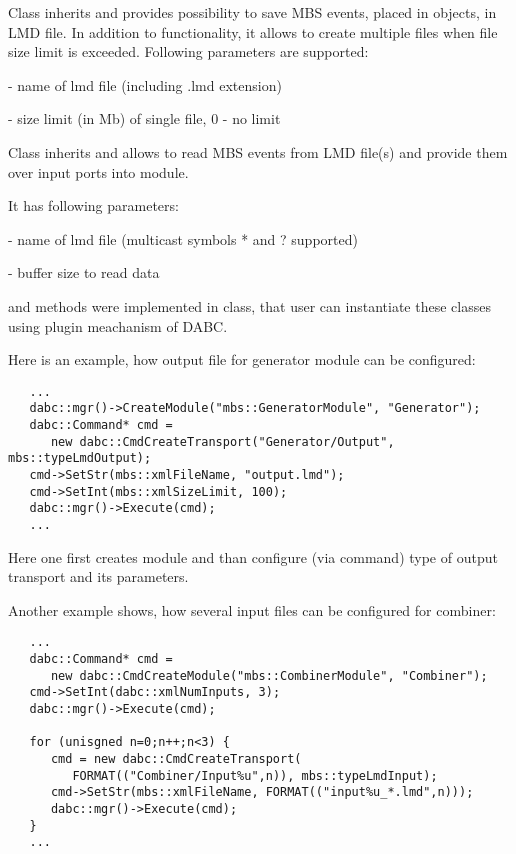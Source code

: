 Class  inherits  and provides possibility to save 
MBS events, placed in  objects, in LMD file. 
In addition to  functionality, it allows to create
multiple files when file size limit is exceeded. Following parameters are supported:
\bbul
\item {}      - name of lmd file (including .lmd extension)  
\item {} - size limit (in Mb) of single file, 0 - no limit
\ebul

Class  inherits  and allows to read 
MBS events from LMD file(s) and provide them over input ports into module.

It has following parameters:
\bbul
\item {} - name of lmd file (multicast symbols * and ? supported)  
\item {}  - buffer size to read data
\ebul

 and  methods were implemented in  class, 
that user can instantiate these classes using plugin meachanism of DABC. 
  

Here is an example, how output file for generator module can be configured:
   
\begin{verbatim}
   ...
   dabc::mgr()->CreateModule("mbs::GeneratorModule", "Generator");
   dabc::Command* cmd = 
      new dabc::CmdCreateTransport("Generator/Output", mbs::typeLmdOutput);
   cmd->SetStr(mbs::xmlFileName, "output.lmd");
   cmd->SetInt(mbs::xmlSizeLimit, 100);
   dabc::mgr()->Execute(cmd);
   ...
\end{verbatim}
       
Here one first creates module and than configure (via command) type of
output transport and its parameters.        
       
Another example shows, how several input files can be configured for combiner:
   
\begin{verbatim}
   ...
   dabc::Command* cmd = 
      new dabc::CmdCreateModule("mbs::CombinerModule", "Combiner");
   cmd->SetInt(dabc::xmlNumInputs, 3);
   dabc::mgr()->Execute(cmd);
   
   for (unisgned n=0;n++;n<3) {
      cmd = new dabc::CmdCreateTransport(
         FORMAT(("Combiner/Input%u",n)), mbs::typeLmdInput);
      cmd->SetStr(mbs::xmlFileName, FORMAT(("input%u_*.lmd",n)));
      dabc::mgr()->Execute(cmd);
   }   
   ...
\end{verbatim}

